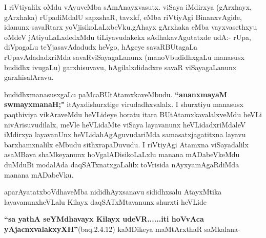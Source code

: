 \begin{artha}
I riVtiyalilx oMdu vAyuveMba sAmAnayxvasutx. viSaya iMdirxya
(gArxhayx, gArxhaka)  rUpadiMdalU sapxshaR, tavxkf,
eMba riVtiyAgi BinanxvAgide, idanunx savaRtarx
yoVjisikoLaLxbeVku.gAhayx gArxhaka eMba vayxvasethxyu oMdeV
jAtiyuLaLxdedxMdu tiLiyavudakekx sAdhakavAgutatxde udA:- rUpa, diVpagaLu
teYjasavAdadudx heVgo, hAgeye savaRBUtagaLa rUpavAdadadxriMda
savaRviSayagaLanunx (manoVbudidhxgaLu manasusx budidhx ivugaLu)
garxhisuvavu, hAgilalxdidadxre savaR viSayagaLanunx garxhisalAravu.

budidhxmanasusxgaLu paMcaBUtAtamxkaveMbudu. \textbf{``ananxmayaM swmayxmanaH;"}
 itAyxdishurxtige virudadhxvalalx. I shurxtiyu manasusx paqthiviya
vikAraveMdu heVLideye horatu itara BUtAtamxkavalalxveMdu heVLi
nivArisuvudilalx, meVle heVLidaMte viSaya layavanunx heVLidadxriMdaleV
iMdirxya layavanUnx heVLidahAgAguvudariMda samasatxjagatitxna layavu
barxhamxnalilx eMbudu sithxrapaDuvudu. I riVtiyAgi Atamxna
viSayadalilx asaMBava shaMkeyanunx hoVgalADisikoLaLxlu manana
mADabeVkeMdu duMduBi modalAda daqSATxnatxgaLalilx toVrisida
nAyxyamAgaRdiMda manana mADabeVku.
\end{artha}

\begin{artha}
aparAyatatxboVdhaveMba nididhAyxsanavu sididhxsalu AtayxMtika
layavanunx\break heVLalu Kilayx daqSATxMtavanunx shurxti heVLide
\end{artha}

\begin{artha}
\textbf{``sa yathA seYMdhavayx Kilayx udeVR......iti hoVvAca yAjacnxvalakxyXH''}\break (baq.2.4.12) kaMDikeya maMtArxthaR saMkalana-
\end{artha}

